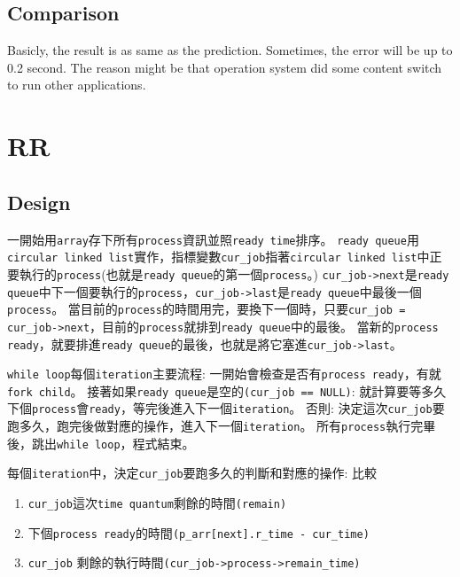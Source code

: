 \documentclass{article}
\begin{document}
\begin{CJK}{UTF8}{bkai}
\subsection{Comparison}
Basicly, the result is as same as the prediction. Sometimes, the error will be up
to 0.2 second. The reason might be that operation system did some content switch
to run other applications.

\section{RR}

\subsection{Design}
一開始用\texttt{array}存下所有\texttt{process}資訊並照\texttt{ready time}排序。
\texttt{ready queue}用\texttt{circular linked list}實作，指標變數\texttt{cur\_job}指著\texttt{circular linked list}中正要執行的\texttt{process}(也就是\texttt{ready queue}的第一個\texttt{process}。)
\texttt{cur\_job->next}是\texttt{ready queue}中下一個要執行的\texttt{process}，\texttt{cur\_job->last}是\texttt{ready queue}中最後一個\texttt{process}。
當目前的\texttt{process}的時間用完，要換下一個時，只要\texttt{cur\_job = cur\_job->next}，目前的\texttt{process}就排到\texttt{ready queue}中的最後。
當新的\texttt{process ready}，就要排進\texttt{ready queue}的最後，也就是將它塞進\texttt{cur\_job->last}。

\texttt{while loop}每個\texttt{iteration}主要流程:
一開始會檢查是否有\texttt{process ready}，有就\texttt{fork child}。
接著如果\texttt{ready queue}是空的\texttt{(cur\_job == NULL)}: 
  就計算要等多久下個\texttt{process}會\texttt{ready}，等完後進入下一個\texttt{iteration}。
否則:
  決定這次\texttt{cur\_job}要跑多久，跑完後做對應的操作，進入下一個\texttt{iteration}。
所有\texttt{process}執行完畢後，跳出\texttt{while loop}，程式結束。

每個\texttt{iteration}中，決定\texttt{cur\_job}要跑多久的判斷和對應的操作:
比較
\begin{enumerate}
\item \texttt{cur\_job}這次\texttt{time quantum}剩餘的時間\texttt{(remain)}
\item 下個\texttt{process ready}的時間\texttt{(p\_arr[next].r\_time - cur\_time)}
\item \texttt{cur\_job} 剩餘的執行時間\texttt{(cur\_job->process->remain\_time)}
\end{enumerate}


\end{CJK}
\end{document}
